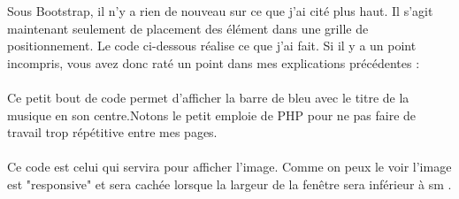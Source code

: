 \documentclass{article}
\begin{document}
Sous Bootstrap, il n'y a rien de nouveau sur ce que j'ai cit\'e plus haut. Il s'agit maintenant seulement de placement des \'el\'ement dans une grille de positionnement. Le code ci-dessous r\'ealise ce que j'ai fait. Si il y a un point incompris, vous avez donc rat\'e un point dans mes explications pr\'ec\'edentes :
\vspace{0.5cm}\\
\vspace{0.5cm}\\
Ce petit bout de code permet d'afficher la barre de bleu avec le titre de la musique en son centre.Notons le petit emploie de PHP pour ne pas faire de travail trop r\'ep\'etitive entre mes pages.
\vspace{0.5cm}\\
\vspace{0.5cm}\\
Ce code est celui qui servira pour afficher l'image. Comme on peux le voir l'image est "responsive" et sera cach\'ee lorsque la largeur de la fen\^etre sera inf\'erieur \`a \og sm \fg{}.
\vspace{0.5cm}\\
\end{document}

